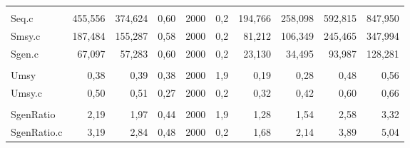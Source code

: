 \documentclass[french,11pt]{book}
\begin{document}
\begin{longtable}[t]{lrrrrrrrrr}
\midrule\\ Seq.c & 455,556 & 374,624 & 0,60 & 2000 & 0,2 & 194,766 & 258,098 & 592,815 & 847,950\\ Smsy.c & 187,484 & 155,287 & 0,58 & 2000 & 0,2 & 81,212 & 106,349 & 245,465 & 347,994\\ Sgen.c & 67,097 & 57,283 & 0,60 & 2000 & 0,2 & 23,130 & 34,495 & 93,987 & 128,281\\
\midrule\\ Umsy & 0,38 & 0,39 & 0,38 & 2000 & 1,9 & 0,19 & 0,28 & 0,48 & 0,56\\ Umsy.c & 0,50 & 0,51 & 0,27 & 2000 & 0,2 & 0,32 & 0,42 & 0,60 & 0,66\\
\midrule\\ SgenRatio & 2,19 & 1,97 & 0,44 & 2000 & 1,9 & 1,28 & 1,54 & 2,58 & 3,32\\ SgenRatio.c & 3,19 & 2,84 & 0,48 & 2000 & 0,2 & 1,68 & 2,14 & 3,89 & 5,04\\* \end{longtable}

\endgroup{} \endgroup{}

\clearpage
\end{document}
